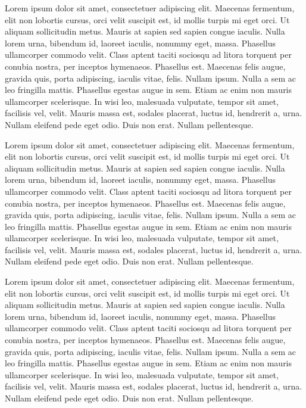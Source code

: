 Lorem ipsum dolor sit amet, consectetuer adipiscing elit. Maecenas
fermentum, elit non lobortis cursus, orci velit suscipit est, id mollis
turpis mi eget orci. Ut aliquam sollicitudin metus. Mauris at sapien sed
sapien congue iaculis. Nulla lorem urna, bibendum id, laoreet iaculis,
nonummy eget, massa. Phasellus ullamcorper commodo velit. Class aptent
taciti sociosqu ad litora torquent per conubia nostra, per inceptos
hymenaeos. Phasellus est. Maecenas felis augue, gravida quis, porta
adipiscing, iaculis vitae, felis. Nullam ipsum. Nulla a sem ac leo
fringilla mattis. Phasellus egestas augue in sem. Etiam ac enim non
mauris ullamcorper scelerisque. In wisi leo, malesuada vulputate, tempor
sit amet, facilisis vel, velit. Mauris massa est, sodales placerat,
luctus id, hendrerit a, urna. Nullam eleifend pede eget odio. Duis non
erat. Nullam pellentesque.

Lorem ipsum dolor sit amet, consectetuer adipiscing elit. Maecenas
fermentum, elit non lobortis cursus, orci velit suscipit est, id mollis
turpis mi eget orci. Ut aliquam sollicitudin metus. Mauris at sapien sed
sapien congue iaculis. Nulla lorem urna, bibendum id, laoreet iaculis,
nonummy eget, massa. Phasellus ullamcorper commodo velit. Class aptent
taciti sociosqu ad litora torquent per conubia nostra, per inceptos
hymenaeos. Phasellus est. Maecenas felis augue, gravida quis, porta
adipiscing, iaculis vitae, felis. Nullam ipsum. Nulla a sem ac leo
fringilla mattis. Phasellus egestas augue in sem. Etiam ac enim non
mauris ullamcorper scelerisque. In wisi leo, malesuada vulputate, tempor
sit amet, facilisis vel, velit. Mauris massa est, sodales placerat,
luctus id, hendrerit a, urna. Nullam eleifend pede eget odio. Duis non
erat. Nullam pellentesque.

Lorem ipsum dolor sit amet, consectetuer adipiscing elit. Maecenas
fermentum, elit non lobortis cursus, orci velit suscipit est, id mollis
turpis mi eget orci. Ut aliquam sollicitudin metus. Mauris at sapien sed
sapien congue iaculis. Nulla lorem urna, bibendum id, laoreet iaculis,
nonummy eget, massa. Phasellus ullamcorper commodo velit. Class aptent
taciti sociosqu ad litora torquent per conubia nostra, per inceptos
hymenaeos. Phasellus est. Maecenas felis augue, gravida quis, porta
adipiscing, iaculis vitae, felis. Nullam ipsum. Nulla a sem ac leo
fringilla mattis. Phasellus egestas augue in sem. Etiam ac enim non
mauris ullamcorper scelerisque. In wisi leo, malesuada vulputate, tempor
sit amet, facilisis vel, velit. Mauris massa est, sodales placerat,
luctus id, hendrerit a, urna. Nullam eleifend pede eget odio. Duis non
erat. Nullam pellentesque.

